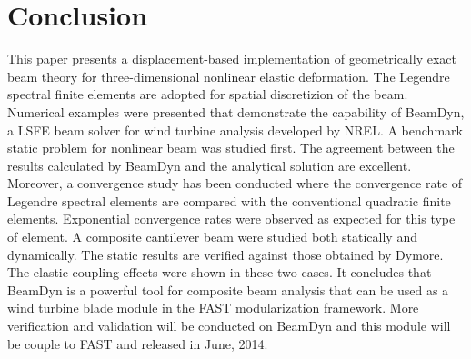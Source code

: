 \section{Conclusion}

This paper presents a displacement-based implementation of geometrically
exact beam theory for three-dimensional nonlinear elastic deformation. The
Legendre spectral finite elements are adopted for spatial discretizion of
the beam. Numerical examples were presented that demonstrate the capability
of BeamDyn, a LSFE beam solver for wind turbine analysis developed by NREL. A benchmark static problem for nonlinear beam was studied first. The agreement between the results calculated by BeamDyn and the analytical solution are excellent. Moreover, a convergence study has been conducted where the convergence rate of Legendre spectral elements are compared with the conventional quadratic finite elements. Exponential convergence rates were observed as expected for this type of element. A composite cantilever beam were studied both statically and dynamically. The static results are verified against those obtained by Dymore. The elastic coupling effects were shown in these two cases. It concludes that BeamDyn is a powerful tool for composite beam analysis that can be used as a wind turbine blade module in the FAST modularization framework. More verification and validation will be conducted on BeamDyn and this module will be couple to FAST and released in June, 2014. 

